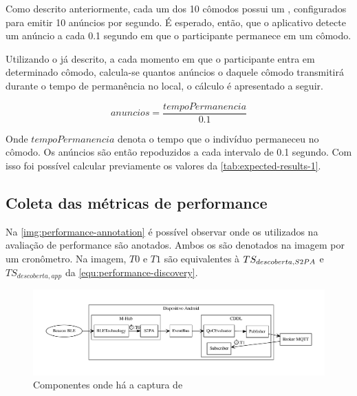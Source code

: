 Como descrito anteriormente, cada um dos 10 cômodos possui um \beacon{} \ble{}, configurados para emitir 10 anúncios por segundo. É esperado, então,  que o aplicativo detecte um anúncio a cada 0.1 segundo em que o participante permanece em um cômodo. 

Utilizando o \dataset{} já descrito, a cada momento em que o participante entra em determinado cômodo, calcula-se quantos anúncios o \beacon{} daquele cômodo transmitirá durante o tempo de permanência no local, o cálculo é apresentado a seguir.

\begin{equation}
	anuncios = \frac{tempoPermanencia}{0.1} 
\end{equation}

Onde $tempoPermanencia$ denota o tempo que o indivíduo permaneceu no cômodo. Os anúncios são então repoduzidos a cada intervalo de 0.1 segundo. Com isso foi possível calcular previamente os valores da \autoref{tab:expected-results-1}.

\subsection{Coleta das métricas de performance}

Na \autoref{img:performance-annotation} é possível observar onde os \timestamps{} utilizados na avaliação de performance são anotados. Ambos os \timestamps{} são denotados na imagem por um cronômetro. Na imagem, $T0$ e $T1$ são equivalentes à $TS_{descoberta,S2PA{}}$ e $TS_{descoberta,app}$ da \autoref{equ:performance-discovery}.

\begin{figure}[htb]
	
	\begin{center}

		\caption{\label{img:performance-annotation}Componentes onde há a captura de \timestamps{}}
		\includegraphics[scale = 0.50]{img/performance-annotation}
		\fonte{\autoriapropria{}}

	\end{center}
	
\end{figure}


